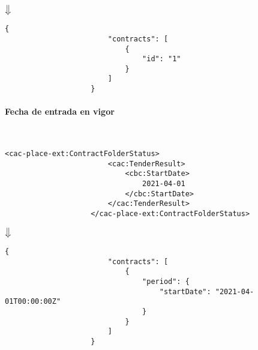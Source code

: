                 \begin{center}
                    $\big\Downarrow$
                \end{center}
\newpage
                \begin{lstlisting}[language=lJSON]
                    {
                        "contracts": [
                            {
                                "id": "1"
                            }
                        ]
                    }
                \end{lstlisting}
                
            \paragraph{Fecha de entrada en vigor} \mbox{}\\
                \begin{lstlisting}[language=lXML]
                    <cac-place-ext:ContractFolderStatus>
                        <cac:TenderResult>
                            <cbc:StartDate>
                                2021-04-01
                            </cbc:StartDate>
                        </cac:TenderResult>
                    </cac-place-ext:ContractFolderStatus>
                \end{lstlisting}
                
                \begin{center}
                    $\big\Downarrow$
                \end{center}
                
                \begin{lstlisting}[language=lJSON]
                    {
                        "contracts": [
                            {
                                "period": {
                                    "startDate": "2021-04-01T00:00:00Z"
                                }
                            }
                        ]
                    }
                \end{lstlisting}

\newpage